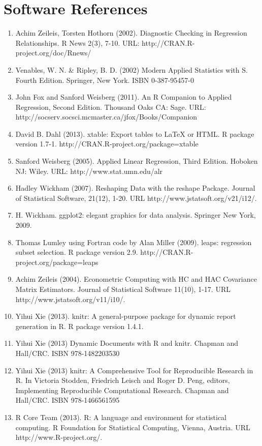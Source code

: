 \documentclass{article}
\begin{document}
\section{Software References}

\begin{enumerate}[1)]
\item Achim Zeileis, Torsten Hothorn (2002). Diagnostic Checking in Regression Relationships. R News 2(3), 7-10.
\indent URL: http://CRAN.R-project.org/doc/Rnews/
\item Venables, W. N. \& Ripley, B. D. (2002) Modern Applied Statistics with S. Fourth Edition. Springer, New York. ISBN 0-387-95457-0
\item John Fox and Sanford Weisberg (2011). An {R} Companion to Applied Regression, Second Edition. Thousand Oaks CA: Sage. 
\indent URL: http://socserv.socsci.mcmaster.ca/jfox/Books/Companion
\item David B. Dahl (2013). xtable: Export tables to LaTeX or HTML. R package version 1.7-1. 
\indent http://CRAN.R-project.org/package=xtable
\item Sanford Weisberg (2005). Applied Linear Regression, Third Edition. Hoboken NJ: Wiley. 
\indent URL: http://www.stat.umn.edu/alr
\item Hadley Wickham (2007). Reshaping Data with the reshape Package. Journal of Statistical Software, 21(12), 1-20. 
\indent URL http://www.jstatsoft.org/v21/i12/.
\item H. Wickham. ggplot2: elegant graphics for data analysis. Springer New York, 2009.
\item Thomas Lumley using Fortran code by Alan Miller (2009). leaps: regression subset selection. R package version 2.9. 
\indent http://CRAN.R-project.org/package=leaps
\item Achim Zeileis (2004). Econometric Computing with HC and HAC Covariance Matrix Estimators. Journal of Statistical Software 11(10), 1-17. 
\indent URL http://www.jstatsoft.org/v11/i10/.
\item Yihui Xie (2013). knitr: A general-purpose package for dynamic report generation in R. R package version 1.4.1.
\item Yihui Xie (2013) Dynamic Documents with R and knitr. Chapman and Hall/CRC. ISBN 978-1482203530
\item Yihui Xie (2013) knitr: A Comprehensive Tool for Reproducible Research in R. In Victoria Stodden, Friedrich Leisch and Roger D. Peng, editors, Implementing Reproducible Computational Research. Chapman and Hall/CRC. ISBN 978-1466561595
\item R Core Team (2013). R: A language and environment for statistical computing. R Foundation for Statistical Computing, Vienna, Austria. 
\indent URL http://www.R-project.org/.
\end{enumerate}
\end{document}
